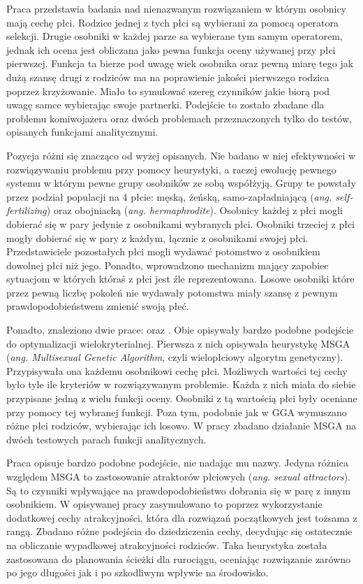 \documentclass[./FM_mgr.tex]{subfiles}
\begin{document}
Praca \cite{sanchez} przedstawia badania nad nienazwanym rozwiązaniem w którym osobnicy mają cechę płci.
Rodzice jednej z tych płci są wybierani za pomocą operatora selekcji. 
Drugie osobniki w każdej parze sa wybierane tym samym operatorem, jednak ich ocena jest obliczana jako pewna funkcja oceny używanej przy płci pierwszej.
Funkcja ta bierze pod uwagę wiek osobnika oraz pewną miarę tego jak dużą szansę drugi z rodziców ma na poprawienie jakości pierwszego rodzica poprzez krzyżowanie.
Miało to symulować szereg czynników jakie biorą pod uwagę samce wybierając swoje partnerki.
Podejście to zostało zbadane dla problemu komiwojażera oraz dwóch problemach przeznaczonych tylko do testów, opisanych funkcjami analitycznymi.

Pozycja \cite{simulating} różni się znacząco od wyżej opisanych.
Nie badano w niej efektywności w rozwiązywaniu problemu przy pomocy heurystyki, a raczej ewolucję pewnego systemu w którym pewne grupy osobników ze sobą współżyją.
Grupy te powstały przez podział populacji na 4 płcie: męską, żeńską, samo-zapładniającą (\emph{ang. self-fertilizing}) oraz obojniacką (\emph{ang. hermaphrodite}).
Osobnicy każdej z płci mogli dobierać się w pary jedynie z osobnikami wybranych płci.
Osobniki trzeciej z płci mogły dobierać się w pary z każdym, łącznie z osobnikami swojej płci.
Przedstawiciele pozostałych płci mogli wydawać potomstwo z osobnikiem dowolnej płci niż jego.
Ponadto, wprowadzono mechanizm mający zapobiec sytuacjom w których któraś z płci jest źle reprezentowana.
Losowe osobniki które przez pewną liczbę pokoleń nie wydawały potomstwa miały szansę z pewnym prawdopodobieństwem zmienić swoją płeć.

Ponadto, znaleziono dwie prace: \cite{msga} oraz \cite{allenson}.
Obie opisywały bardzo podobne podejście do optymalizacji wielokryterialnej.
Pierwsza z nich opisywała heurystykę MSGA (\emph{ang. Multisexual Genetic Algorithm}, czyli wielopłciowy algorytm genetyczny).
Przypisywała ona każdemu osobnikowi cechę płci.
Możliwych wartości tej cechy było tyle ile kryteriów w rozwiązywanym problemie.
Każda z nich miała do siebie przypisane jedną z wielu funkcji oceny.
Osobniki z tą wartością płci były oceniane przy pomocy tej wybranej funkcji.
Poza tym, podobnie jak w GGA wymuszano różne płci rodziców, wybierając ich losowo.
W pracy \cite{msga} zbadano działanie MSGA na dwóch testowych parach funkcji analitycznych.

Praca \cite{allenson} opisuje bardzo podobne podejście, nie nadając mu nazwy.
Jedyna różnica względem MSGA to zastosowanie atraktorów płciowych (\emph{ang. sexual attractors}).
Są to czynniki wpływające na prawdopodobieństwo dobrania się w parę z innym osobnikiem.
W opisywanej pracy zasymulowano to poprzez wykorzystanie dodatkowej cechy atrakcyjności, która dla rozwiązań początkowych jest tożsama z rangą.
Zbadano różne podejścia do dziedziczenia cechy, decydując się ostatecznie na obliczanie wypadkowej atrakcyjności rodziców.
Taka heurystyka została zastosowana do planowania ścieżki dla rurociągu, oceniając rozwiązanie zarówno po jego długości jak i po szkodliwym wpływie na środowisko.
\end{document}
